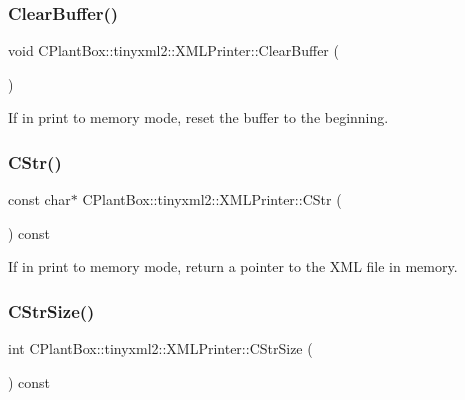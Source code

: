 \subsubsection{\texorpdfstring{Clear\+Buffer()}{ClearBuffer()}}
{\footnotesize\ttfamily void C\+Plant\+Box\+::tinyxml2\+::\+X\+M\+L\+Printer\+::\+Clear\+Buffer (\begin{DoxyParamCaption}{ }\end{DoxyParamCaption})\hspace{0.3cm}{\ttfamily [inline]}}

If in print to memory mode, reset the buffer to the beginning. \mbox{\label{classCPlantBox_1_1tinyxml2_1_1XMLPrinter_a5cc0b2a78c8e09105f2ba576bc471c3d}} 
\subsubsection{\texorpdfstring{C\+Str()}{CStr()}}
{\footnotesize\ttfamily const char$\ast$ C\+Plant\+Box\+::tinyxml2\+::\+X\+M\+L\+Printer\+::\+C\+Str (\begin{DoxyParamCaption}{ }\end{DoxyParamCaption}) const\hspace{0.3cm}{\ttfamily [inline]}}

If in print to memory mode, return a pointer to the X\+ML file in memory. \mbox{\label{classCPlantBox_1_1tinyxml2_1_1XMLPrinter_ab89d2702a07147d297b1ea373fd9007f}} 
\subsubsection{\texorpdfstring{C\+Str\+Size()}{CStrSize()}}
{\footnotesize\ttfamily int C\+Plant\+Box\+::tinyxml2\+::\+X\+M\+L\+Printer\+::\+C\+Str\+Size (\begin{DoxyParamCaption}{ }\end{DoxyParamCaption}) const\hspace{0.3cm}{\ttfamily [inline]}}

